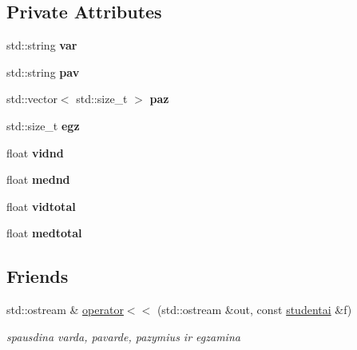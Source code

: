 \subsection*{Private Attributes}
\begin{DoxyCompactItemize}
\item 
\mbox{\label{classstudentai_a062d2dbd65b17b1c5769abcb265b0125}} 
std\+::string {\bfseries var}
\item 
\mbox{\label{classstudentai_aa53616bbad454325601f4d2c84bde9b2}} 
std\+::string {\bfseries pav}
\item 
\mbox{\label{classstudentai_a23483837d73885e99f303ab27d0e9596}} 
std\+::vector$<$ std\+::size\+\_\+t $>$ {\bfseries paz}
\item 
\mbox{\label{classstudentai_adc56a0f39e5d39f370fce76f7b737d42}} 
std\+::size\+\_\+t {\bfseries egz}
\item 
\mbox{\label{classstudentai_a6f62193bab8b44b81b9acff0fa1bf349}} 
float {\bfseries vidnd}
\item 
\mbox{\label{classstudentai_ade25503fdef58355cdde25a1dcc7007b}} 
float {\bfseries mednd}
\item 
\mbox{\label{classstudentai_aff73d562e6ffc8e6b112d3c21dddc4ec}} 
float {\bfseries vidtotal}
\item 
\mbox{\label{classstudentai_a722ea02faaed0f38a48e2f0dcec02b26}} 
float {\bfseries medtotal}
\end{DoxyCompactItemize}
\subsection*{Friends}
\begin{DoxyCompactItemize}
\item 
\mbox{\label{classstudentai_a175fcf4a16c978c5e786e3628b14666a}} 
std\+::ostream \& \mbox{\hyperlink{classstudentai_a175fcf4a16c978c5e786e3628b14666a}{operator$<$$<$}} (std\+::ostream \&out, const \mbox{\hyperlink{classstudentai}{studentai}} \&f)
\begin{DoxyCompactList}\small\item\em spausdina varda, pavarde, pazymius ir egzamina \end{DoxyCompactList}\end{DoxyCompactItemize}


